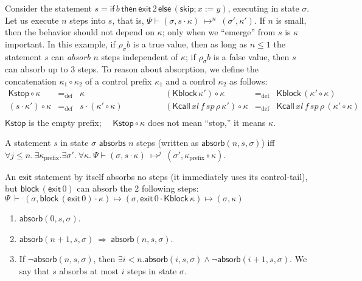 \documentclass{llncs}
\newcommand{\tyface}[1]{\ensuremath{\mathsf{#1}}}
\newcommand{\Sassign}[2]{#1:=#2}
\newcommand{\Sif}[3]{\tyface{if}\,#1\,\tyface{then}\,#2\,\tyface{else}\,#3}
\newcommand{\Sblock}[1]{\tyface{block}\,#1}
\newcommand{\Sexit}[1]{\tyface{exit}\,#1}
\newcommand{\Sseq}[2]{#1;#2}
\newcommand{\Sskip}{\tyface{skip}}
\newcommand{\Kstop}{\tyface{Kstop}}
\newcommand{\Kseq}[2]{#1\cdot #2}
\newcommand{\Kblock}[1]{\tyface{Kblock\,#1}}
\newcommand{\Kcall}[5]{\tyface{Kcall}\,#1\,#2\,#3\,#4\,#5}
\newcommand{\Cont}[2]{(#1,#2)}
\newcommand{\st}{\sigma}
\newcommand{\ctl}{\kappa} \newcommand{\stmt}{\tyface{stmt}}
\newcommand{\fmap}{\Psi}
\newcommand{\stepn}[3]{\fmap \vdash #1\:{\longmapsto^{#3}}\:#2}
\newcommand{\absorb}[3]{\tyface{absorb}(#1,#2,#3)}
\newcommand{\cat}[2]{#1 \circ #2}
\begin{document}
Consider the statement $s=\Sif{b}{\Sexit{2}}{(\Sseq{\Sskip{}}{\Sassign{x}{y}})}$, executing in state $\st$.
Let us execute $n$ steps into $s$, that is, 
$\stepn{(\st,\Kseq{s}{\ctl})}{(\st',\ctl')}{n}$.
If $n$ is small, then the behavior should not depend on $\ctl$;
only when we ``emerge'' from $s$ is $\ctl$ important.
In this example,
if $\rho_\st b$ is a true value, then as long as $n\le 1$ the
statement $s$ can \emph{absorb} $n$ steps independent of $\ctl$;
if $\rho_\st b$ is a false value, then $s$ can absorb up to 3 steps.
To reason about absorption, we define the
concatenation $\cat{\ctl_1}{\ctl_2}$ 
of a control prefix $\ctl_1$ and a control $\ctl_2$ as follows:
\vspace{-7pt}
\[
\begin{array}{rclrcl}
\cat{\Kstop}{\ctl} &=_\mathrm{def}& \ctl &
\cat{(\Kblock{\ctl'})}{\ctl} &=_\mathrm{def}& \Kblock{(\cat{\ctl'}{\ctl})}\\
\cat{(\Kseq{s}{\ctl'})}{\ctl} &=_\mathrm{def}& \Kseq{s}{(\cat{\ctl'}{\ctl})}\,\qquad\qquad&
\cat{(\Kcall{\mathit{xl}}{f}{\mathit{sp}}{\rho}{\ctl'})}{\ctl} &=_\mathrm{def}& 
\Kcall{\mathit{xl}}{f}{\mathit{sp}}{\rho}{(\cat{\ctl'}{\ctl})}\\
\end{array}\]
$\Kstop$ is the empty prefix; 
~~$\cat{\Kstop}{\ctl}$ does not mean ``stop,'' it means $\ctl$.

\begin{definition}[absorption]
A statement $s$ in state $\st$ \tyface{absorbs} $n$ steps (written as  $\absorb{n}{s}{\st}$) iff 
$\forall j \leq n.\, \exists \ctl_{\mathrm{prefix}}.\exists \st'.~ \forall \ctl.~
\stepn{\Cont{\st}{\Kseq{s}{\ctl}}}{\Cont{\st'}{\cat{\ctl_{\mathrm{prefix}}}{\ctl}}}{j}$.
\end{definition}

\begin{example}
An \tyface{exit} statement by itself absorbs no steps (it immediately
uses its control-tail), but
$\Sblock{(\Sexit 0)}$ can absorb the 2 following steps:\newline
$\fmap ~\vdash ~ (\st,\Kseq{\Sblock{(\Sexit 0)}}{\ctl})\longmapsto
(\st,\Kseq{\Sexit 0}{\Kblock\ctl})\longmapsto
(\st,\ctl)$
\end{example}

\begin{lemma}
\begin{enumerate}
\item $\absorb{0}{s}{\st}$.
\item $\absorb{n+1}{s}{\st}~ \Rightarrow~ \absorb{n}{s}{\st}$.
\item If $\neg \absorb {n}{s}{\st}$, then 
$\exists i<n. \absorb{i}{s}{\st} \wedge \neg \absorb{i+1}{s}{\st}$.
We say that $s$ absorbs at most $i$ steps in state $\st$.
\end{enumerate}
\end{lemma}
\end{document}
